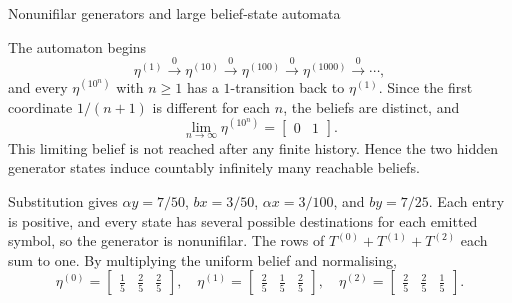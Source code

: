 {\begin{exercise}[Extension]{Nonunifilar generators and large belief-state automata}
\begin{solution}
\begin{parts}
\begin{subparts}
          \item The automaton begins
            \[
              \eta^{(1)}\xrightarrow{\,0\,}\eta^{(10)}
              \xrightarrow{\,0\,}\eta^{(100)}
              \xrightarrow{\,0\,}\eta^{(1000)}
              \xrightarrow{\,0\,}\cdots,
            \]
            and every $\eta^{(10^n)}$ with $n\geq1$ has a $1$-transition
            back to $\eta^{(1)}$. Since the first coordinate
            $1/(n+1)$ is different for each $n$, the beliefs are distinct, and
            \[
              \lim_{n\to\infty}\eta^{(10^n)}
                =\begin{bmatrix}0&1\end{bmatrix}.
            \]
            This limiting belief is not reached after any finite history.
            Hence the two hidden generator states induce countably infinitely
            many reachable beliefs.
        \end{subparts}

      \item
        \begin{subparts}
          \item Substitution gives
            $\alpha y=7/50$, $bx=3/50$, $\alpha x=3/100$, and
            $by=7/25$. Each entry is positive, and every state has several
            possible destinations for each emitted symbol, so the generator
            is nonunifilar. The rows of $T^{(0)}+T^{(1)}+T^{(2)}$ each sum to
            one. By multiplying the uniform belief and normalising,
            \[
              \eta^{(0)}=\begin{bmatrix}\tfrac15&\tfrac25&\tfrac25\end{bmatrix},
              \quad
              \eta^{(1)}=\begin{bmatrix}\tfrac25&\tfrac15&\tfrac25\end{bmatrix},
              \quad
              \eta^{(2)}=\begin{bmatrix}\tfrac25&\tfrac25&\tfrac15\end{bmatrix}.
            \]


\end{subparts}
\end{parts}
\end{solution}
\end{exercise}}
